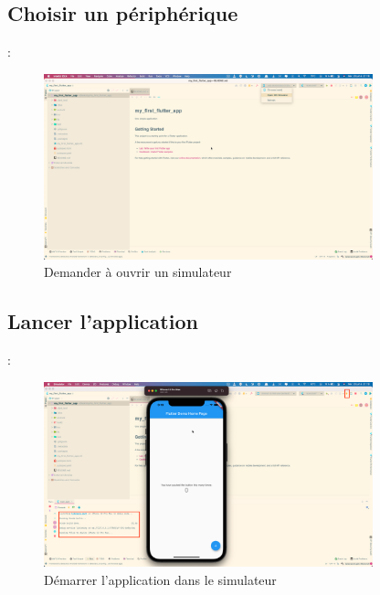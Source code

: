 \documentclass[10pt]{beamer}
\begin{document}
\subsection{Choisir un périphérique}
\begin{frame}[fragile,t]{\secname : \subsecname}
    \begin{figure}[H]
        \begin{center}
            \includegraphics[width=0.85\textwidth]{../assets/img/new-project-3.jpg}
            \caption*{Demander à ouvrir un simulateur}
            \label{Fig:new-project-3}
        \end{center}
    \end{figure}
\end{frame}

\subsection{Lancer l'application}
\begin{frame}[fragile,t]{\secname : \subsecname}
    \begin{figure}[H]
        \begin{center}
            \includegraphics[width=0.85\textwidth]{../assets/img/new-project-5.jpg}
            \caption*{Démarrer l'application dans le simulateur}
            \label{Fig:new-project-5}
        \end{center}
    \end{figure}
\end{frame}
\end{document}
